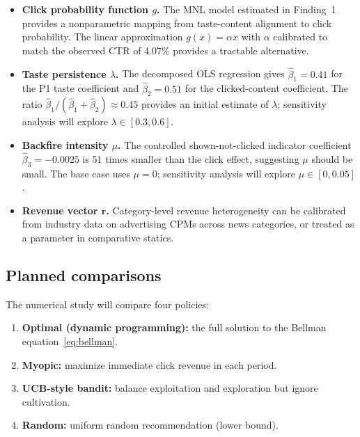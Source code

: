 \documentclass[11pt]{article}
\begin{document}
\begin{itemize}[leftmargin=1.5em, itemsep=0.3em]
\item \textbf{Click probability function $g$.} The MNL model estimated in Finding~1 provides a nonparametric mapping from taste-content alignment to click probability. The linear approximation $g(x) = \alpha x$ with $\alpha$ calibrated to match the observed CTR of 4.07\% provides a tractable alternative.

\item \textbf{Taste persistence $\lambda$.} The decomposed OLS regression gives $\hat{\beta}_1 = 0.41$ for the P1 taste coefficient and $\hat{\beta}_2 = 0.51$ for the clicked-content coefficient. The ratio $\hat{\beta}_1/(\hat{\beta}_1 + \hat{\beta}_2) \approx 0.45$ provides an initial estimate of $\lambda$; sensitivity analysis will explore $\lambda \in [0.3, 0.6]$.

\item \textbf{Backfire intensity $\mu$.} The controlled shown-not-clicked indicator coefficient $\hat{\beta}_3 = -0.0025$ is 51 times smaller than the click effect, suggesting $\mu$ should be small. The base case uses $\mu = 0$; sensitivity analysis will explore $\mu \in [0, 0.05]$.

\item \textbf{Revenue vector $\mathbf{r}$.} Category-level revenue heterogeneity can be calibrated from industry data on advertising CPMs across news categories, or treated as a parameter in comparative statics.
\end{itemize}

\subsection{Planned comparisons}

The numerical study will compare four policies:

\begin{enumerate}[leftmargin=1.5em]
\item \textbf{Optimal (dynamic programming):} the full solution to the Bellman equation~\eqref{eq:bellman}.
\item \textbf{Myopic:} maximize immediate click revenue in each period.
\item \textbf{UCB-style bandit:} balance exploitation and exploration but ignore cultivation.
\item \textbf{Random:} uniform random recommendation (lower bound).
\end{enumerate}
\end{document}
